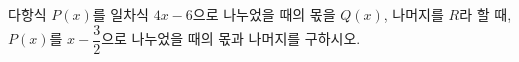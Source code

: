 다항식 $P(x)$를 일차식 $4x-6$으로 나누었을 때의 몫을 $Q(x)$, 나머지를 $R$라 할 때, $P(x)$를 $x-\dfrac{3}{2}$으로 나누었을 때의 몫과 나머지를 구하시오.
